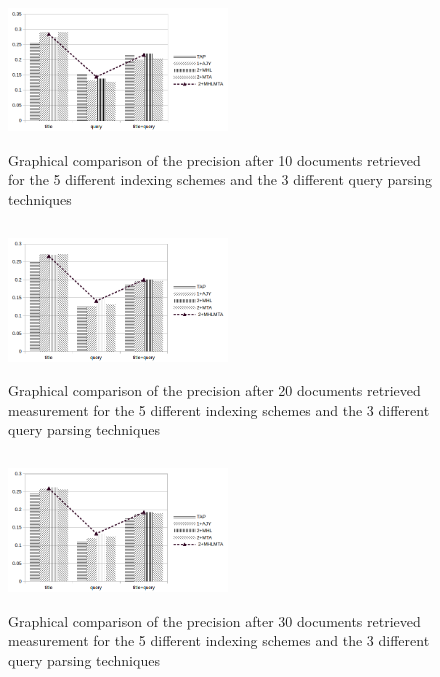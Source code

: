 \begin{figure}[H]
    \centering 
 \includegraphics[height=4.05cm,width=0.520\textwidth]{precision_after_10.png}
 \vspace{-0.75cm}
    \caption{Graphical comparison of the precision after 10 documents retrieved for the 5 different indexing schemes and the 3 different query parsing techniques}
    \label{fig:p_10}
\end{figure}
\vspace{-0.5cm}
\begin{figure}[H]
    \centering 
  \includegraphics[height=4.05cm,width=0.520\textwidth]{precision_after_20.png}
    \vspace{-0.75cm}
    \caption{Graphical comparison of the precision after 20 documents retrieved measurement for the 5 different indexing schemes and the 3 different query parsing techniques}
    \label{fig:p_20}
\end{figure}
\vspace{-0.5cm}
\begin{figure}[H]
    \centering 
  \includegraphics[height=4.05cm,width=0.520\textwidth]{precision_after_30.png}
  \vspace{-0.75cm}
    \caption{Graphical comparison of the precision after 30 documents retrieved measurement for the 5 different indexing schemes and the 3 different query parsing techniques}
    \label{fig:p_30}
\end{figure}
